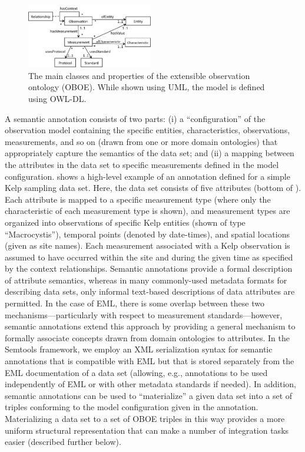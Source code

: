 \begin{figure}[!t]
  \centering
  \includegraphics[width=0.49\textwidth]{images/oboe}
  \caption{The main classes and properties of the extensible
    observation ontology (OBOE). While shown using UML, the model is
    defined using OWL-DL.}
  \label{fig:oboe}
\end{figure}

 A semantic annotation consists of two
parts: (i) a ``configuration'' of the observation model containing the
specific entities, characteristics, observations, measurements, and so
on (drawn from one or more domain ontologies) that appropriately
capture the semantics of the data set; and (ii) a mapping between the
attributes in the data set to specific measurements defined in the
model configuration.  shows a high-level
example of an annotation defined for a simple Kelp sampling data
set. Here, the data set consists of five attributes (bottom of
). Each attribute is mapped to a specific
measurement type (where only the characteristic of each measurement
type is shown), and measurement types are organized into observations
of specific Kelp entities (shown of type ``Macrocystis''), temporal
points (denoted by date-times), and spatial locations (given as site
names). Each measurement associated with a Kelp observation is assumed
to have occurred within the site and during the given time as
specified by the context relationships.  Semantic annotations provide
a formal description of attribute semantics, whereas in many
commonly-used metadata formats for describing data sets,  only
informal text-based descriptions of data attributes are permitted.  In
the case of EML, there is some overlap between these two
mechanisms---particularly with respect to measurement
standards---however, semantic annotations extend this approach by
providing a general mechanism to formally associate concepts drawn
from domain ontologies to attributes. In the Semtools framework, we
employ an XML serialization syntax for semantic annotations that is
compatible with EML but that is stored separately from the EML
documentation of a data set (allowing, e.g., annotations to be used
independently of EML or with other metadata standards if needed). In addition, semantic annotations can
be used to ``materialize'' a given data set into a set of triples
conforming to the model configuration given in the annotation.
Materializing a data set to a set of OBOE triples in this way provides
a more uniform structural representation that can make a number of
integration tasks easier (described further below).

